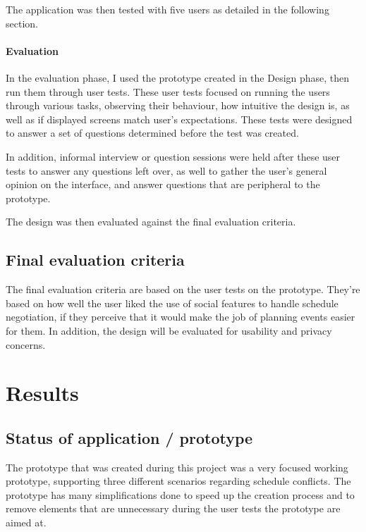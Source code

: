 \documentclass[]{report}
\begin{document}
The application was then tested with five users as detailed in the following
section.

\subsubsection{Evaluation}

In the evaluation phase, I used the prototype created in the Design phase, then
run them through user tests. These user tests focused on running the users
through various tasks, observing their behaviour, how intuitive the design is,
as well as if displayed screens match user's expectations. These tests were
designed to answer a set of questions determined before the test was created.

In addition, informal interview or question sessions were held after these user
tests to answer any questions left over, as well to gather the user's general
opinion on the interface, and answer questions that are peripheral to the
prototype.

The design was then evaluated against the final evaluation criteria.

\section{Final evaluation criteria}

The final evaluation criteria are based on the user tests on the
prototype. They're based on how well the user liked the use of social features
to handle schedule negotiation, if they perceive that it would make the job of
planning events easier for them. In addition, the design will be evaluated for
usability and privacy concerns.

\chapter{Results}

\section{Status of application / prototype}

The prototype that was created during this project was a very focused working
prototype, supporting three different scenarios regarding schedule
conflicts. The prototype has many simplifications done to speed up the creation
process and to remove elements that are unnecessary during the user tests the
prototype are aimed at.
\end{document}
